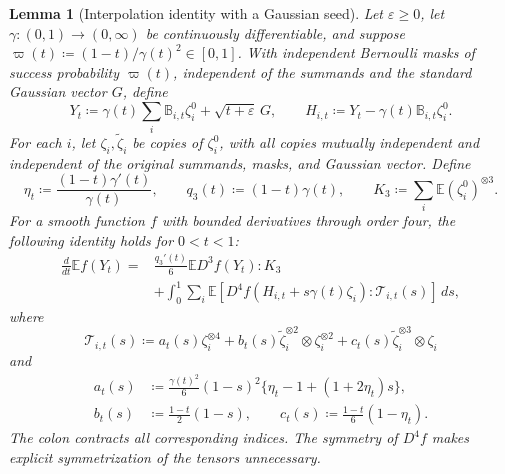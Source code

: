 \documentclass[11pt,letterpaper]{article}
\newtheorem{lemma}{Lemma}
\theoremstyle{remark}
\newcommand{\E}{\mathbb E}
\newcommand{\dd}{\,d}
\begin{document}
\begin{lemma}[Interpolation identity with a Gaussian seed]
\label{appx-an:lem:identity}
Let \(\varepsilon\ge0\), let \(\gamma:(0,1)\to(0,\infty)\) be
continuously differentiable, and suppose
\(\varpi(t)\coloneqq(1-t)/\gamma(t)^2\in[0,1]\). With independent
Bernoulli masks of success probability \(\varpi(t)\), independent
of the summands and the standard Gaussian vector \(G\), define
\begin{equation}
 Y_t\coloneqq\gamma(t)\sum_i\mathbb B_{i,t}\zeta_i^0
                    +\sqrt{t+\varepsilon}\,G,\qquad
 H_{i,t}\coloneqq Y_t-\gamma(t)\mathbb B_{i,t}\zeta_i^0.
 \label{eq:interpolation-family}
\end{equation}
For each \(i\), let \(\zeta_i,\widetilde\zeta_i\) be copies of
\(\zeta_i^0\), with all copies mutually independent and independent
of the original summands, masks, and Gaussian vector. {Define}
\[
 \eta_t\coloneqq\frac{(1-t)\gamma'(t)}{\gamma(t)},\qquad
 q_3(t)\coloneqq(1-t)\gamma(t),\qquad
 K_3\coloneqq\sum_i\E(\zeta_i^0)^{\otimes3}.
\]
For a smooth function \(f\) with bounded derivatives through order
four, the following identity holds for \(0<t<1\):
\begin{equation}
 \begin{aligned}
 \frac{d}{dt}\E f(Y_t)
 ={}&\frac{q_3'(t)}6\E D^3f(Y_t):K_3\\
 &+\int_0^1\sum_i\E\!\left[
       D^4f(H_{i,t}+s\gamma(t)\zeta_i):\mathcal T_{i,t}(s)
     \right]\dd s,
 \end{aligned}
 \label{appx-an:fourth-identity}
\end{equation}
where
\[
 \mathcal T_{i,t}(s)\coloneqq
 a_t(s)\zeta_i^{\otimes4}
 +b_t(s)\widetilde\zeta_i^{\otimes2}\otimes\zeta_i^{\otimes2}
 +c_t(s)\widetilde\zeta_i^{\otimes3}\otimes\zeta_i
\]
and
\begin{equation}
 \begin{aligned}
 a_t(s)&\coloneqq\frac{\gamma(t)^2}{6}(1-s)^2
                   \{\eta_t-1+(1+2\eta_t)s\},\\
 b_t(s)&\coloneqq\frac{1-t}{2}(1-s),\qquad
 c_t(s)\coloneqq\frac{1-t}{6}(1-\eta_t).
 \end{aligned}
 \label{appx-an:kernel}
\end{equation}
The colon contracts all corresponding indices. The symmetry of
\(D^4f\) makes explicit symmetrization of the tensors unnecessary.
\end{lemma}
\end{document}
